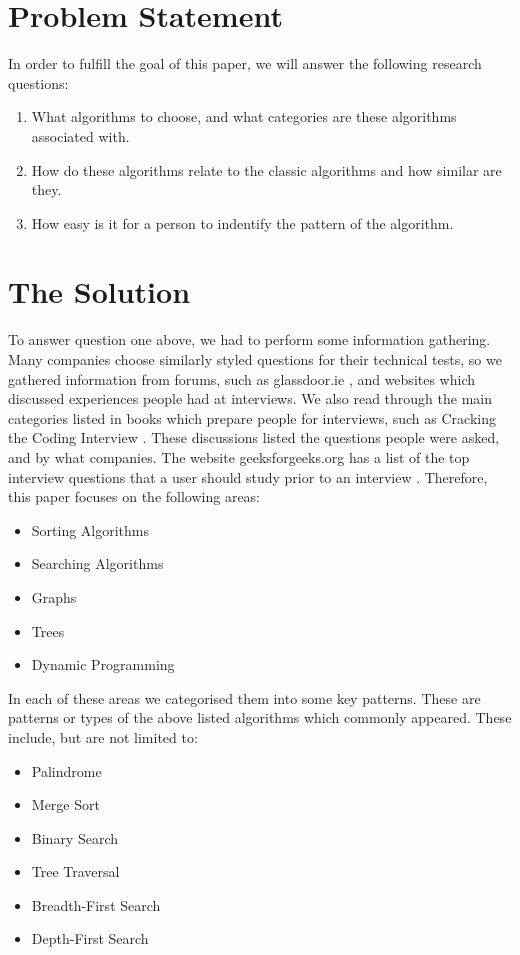 \documentclass[10pt,twocolumn]{IEEEtran}
\begin{document}
\section{Problem Statement}
\label{label:problemstmt}
In order to fulfill the goal of this paper, we will answer the following research questions:
\begin{enumerate}
\item What algorithms to choose, and what categories are these algorithms associated with. 
\item How do these algorithms relate to the classic algorithms and how similar are they.
\item How easy is it for a person to indentify the pattern of the algorithm.
\end{enumerate}

\section{The Solution}
To answer question one above, we had to perform some information gathering. Many companies choose similarly styled questions for their technical tests, so we gathered information from forums, such as glassdoor.ie \cite{glassdoor}, and websites which discussed experiences people had at interviews. We also read through the main categories listed in books which prepare people for interviews, such as Cracking the Coding Interview \cite{mcdowell2015cracking}. These discussions listed the questions people were asked, and by what companies. The website geeksforgeeks.org has a list of the top interview questions that a user should study prior to an interview \cite{geeksalgos}. Therefore, this paper focuses on the following areas:
\begin{itemize}
\item Sorting Algorithms
\item Searching Algorithms
\item Graphs
\item Trees
\item Dynamic Programming
\end{itemize}
In each of these areas we categorised them into some key patterns. These are patterns or types of the above listed algorithms which commonly appeared. These include, but are not limited to:
\begin{itemize}
\item Palindrome
\item Merge Sort
\item Binary Search
\item Tree Traversal
\item Breadth-First Search
\item Depth-First Search
\label{itm:patterns}
\end{itemize} 
\end{document}
